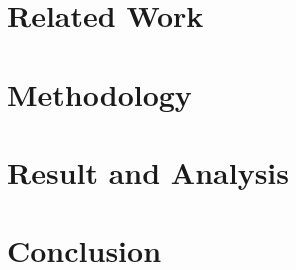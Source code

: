 \documentclass[Times,12pt,oneside,openany,print,index]{report}
\let\cleardoublepage=\clearpage %
\begin{document}
\chapter{Related Work}\label{related_work} 


\chapter{Methodology}\label{methodology}


\chapter{Result and Analysis}\label{result_and_analysis}


\chapter{Conclusion}\label{conclusion}



\cleardoublepage
{}
{}
\printbibliography %

% 
\end{document}
